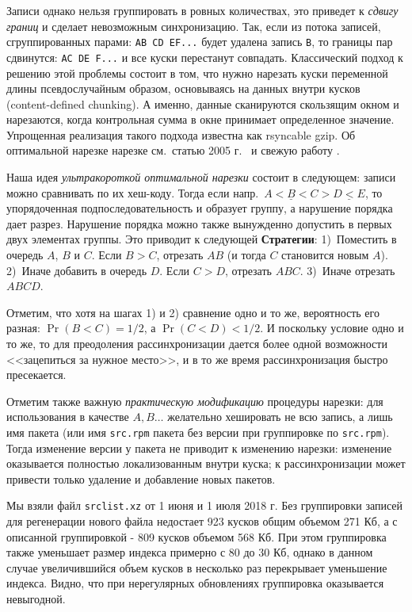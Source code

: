 \documentclass[russian,a4paper,12pt]{article}
\begin{document}
Записи однако нельзя группировать в ровных количествах, это приведет к \textit{сдвигу границ} и сделает невозможным синхронизацию.
Так, если из потока записей, сгруппированных парами: \texttt{AB CD EF...} будет удалена запись \verb|B|, то границы пар сдвинутся:
\texttt{AC DE F...} и все куски перестанут совпадать.  Классический подход к решению этой проблемы состоит в том, что нужно
нарезать куски переменной длины псевдослучайным образом, основываясь на данных внутри кусков (content-defined chunking).
А именно, данные сканируются скользящим окном и нарезаются, когда контрольная сумма в окне принимает определенное значение.
Упрощенная реализация такого подхода известна как rsyncable gzip.  Об оптимальной нарезке нарезке см.~статью 2005 г.~\cite{hp}
и свежую работу \cite{xia}.

Наша идея \textit{ультракороткой оптимальной нарезки} состоит в следующем: записи можно сравнивать по их хеш-коду.
Тогда если напр.~$\underline{A<B<C}>\underline{D<E}$, то упорядоченная подпоследовательность и образует группу,
а нарушение порядка дает разрез.  Нарушение порядка можно также вынужденно допустить в первых двух элементах группы.
Это приводит к следующей \textbf{Стратегии}: 1)~Поместить в очередь $A$, $B$ и $C$.  Если $B>C$, отрезать $AB$ (и тогда $C$
становится новым $A$). 2)~Иначе добавить в очередь $D$.  Если $C>D$, отрезать $ABC$.  3)~Иначе отрезать $ABCD$.

Отметим, что хотя на шагах 1) и 2) сравнение одно и то же, вероятность его разная: $\Pr(B<C)=1/2$, а $\Pr(C<D)<1/2$.
И поскольку условие одно и то же, то для преодоления рассинхронизации дается более одной возможности <<зацепиться
за нужное место>>, и в то же время рассинхронизация быстро пресекается.

Отметим также важную \textit{практическую модификацию} процедуры нарезки: для использования в качестве $A, B\ldots$
желательно хешировать не всю запись, а лишь имя пакета (или имя \verb|src.rpm| пакета без версии при группировке по \verb|src.rpm|).
Тогда изменение версии у пакета не приводит к изменению нарезки: изменение оказывается полностью локализованным внутри куска;
к рассинхронизации может привести только удаление и добавление новых пакетов.

Мы взяли файл \verb|srclist.xz| от 1 июня и 1 июля 2018 г.  Без группировки записей для регенерации нового файла
недостает 923 кусков общим объемом 271 Кб, а с описанной группировкой - 809 кусков объемом 568 Кб.  При этом группировка
также уменьшает размер индекса примерно с 80 до 30 Кб, однако в данном случае увеличившийся объем кусков в несколько
раз перекрывает уменьшение индекса.  Видно, что при нерегулярных обновлениях группировка оказывается невыгодной.
\end{document}
